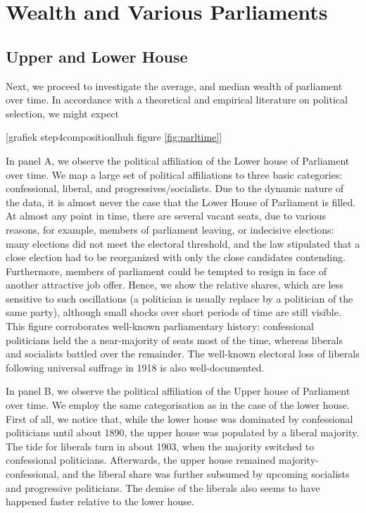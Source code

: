 \section{Wealth and Various Parliaments}

\subsection{Upper and Lower House}
Next, we proceed to investigate the average, and median wealth of parliament over time. In accordance with a theoretical and empirical literature on political selection, we might expect 

\begin{center}

    [grafiek step4compositionlhuh figure \ref{fig:parltime}]
\end{center}

    In panel A, we observe the political affiliation of the Lower house of Parliament over time. We map a large set of political affiliations to three basic categories: confessional, liberal, and progressives/socialists. Due to the dynamic nature of the data, it is almost never the case that the Lower House of Parliament is filled. At almost any point in time, there are several vacant seats, due to various reasons, for example, members of parliament leaving, or indecisive elections: many elections did not meet the electoral threshold, and the law stipulated that a close election had to be reorganized with only the close candidates contending. Furthermore, members of parliament could be tempted to resign in face of another attractive job offer. Hence, we show the relative shares, which are less sensitive to such oscillations (a politician is usually replace by a politician of the same party), although small shocks over short periods of time are still visible. This figure corroborates well-known parliamentary history: confessional politicians held the a near-majority of seats most of the time, whereas liberals and socialists battled over the remainder. The well-known electoral loss of liberals following universal suffrage in 1918 is also well-documented. \autocite{van2018tussen} 
    
    In panel B, we observe the political affiliation of the Upper house of Parliament over time. We employ the same categorisation as in the case of the lower house. First of all, we notice that, while the lower house was dominated by confessional politicians until about 1890, the upper house was populated by a liberal majority. The tide for liberals turn in about 1903, when the majority switched to confessional politicians. Afterwards, the upper house remained majority-confessional, and the liberal share was further subsumed by upcoming socialists and progressive politicians. The demise of the liberals also seems to have happened faster relative to the lower house. 
    
